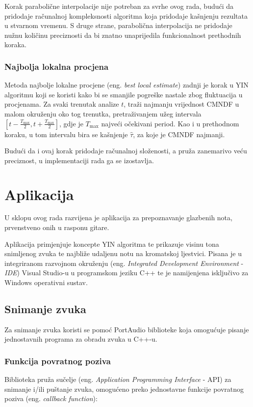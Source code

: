 \documentclass[times, utf8, diplomski, numeric]{fer}
\begin{document}
Korak parabolične interpolacije nije potreban za svrhe ovog rada, budući da pridodaje računalnoj kompleksnosti algoritma koja pridodaje kašnjenju rezultata u stvarnom vremenu. S druge strane, parabolična interpolacija ne pridodaje nužnu količinu preciznosti da bi znatno unaprijedila funkcionalnost prethodnih koraka.

\subsection{Najbolja lokalna procjena}
%
Metoda najbolje lokalne procjene (eng. \textit{best local estimate}) zadnji je korak u YIN algoritmu koji se koristi kako bi se smanjile pogreške nastale zbog fluktuacija u procjenama. Za svaki trenutak analize $t$, traži najmanju vrijednost CMNDF u malom okruženju oko tog trenutka, pretraživanjem užeg intervala $[t - \frac{T_{\text{max}}}{2}, t + \frac{T_{\text{max}}}{2}]$, gdje je $T_{\text{max}}$ najveći očekivani period. Kao i u prethodnom koraku, u tom intervalu bira se kašnjenje $\hat{\tau}$, za koje je CMNDF najmanji.

Budući da i ovaj korak pridodaje računalnoj složenosti, a pruža zanemarivo veću preciznost, u implementaciji rada ga se izostavlja.

\chapter{Aplikacija}
%
U sklopu ovog rada razvijena je aplikacija za prepoznavanje glazbenih nota, prvenstveno onih u rasponu gitare.

Aplikacija primjenjuje koncepte YIN algoritma te prikazuje visinu tona snimljenog zvuka te najbliže udaljenu notu na kromatskoj ljestvici. Pisana je u integriranom razvojnom okruženju (eng. \textit{Integrated Development Environment} - \textit{IDE}) Visual Studio-u u programskom jeziku C++ te je namijenjena isključivo za Windows operativni sustav.

\section{Snimanje zvuka}
%
Za snimanje zvuka koristi se pomoć PortAudio\cite{portaudio} biblioteke koja omogućuje pisanje jednostavnih programa za obradu zvuka u C++-u.

\subsection{Funkcija povratnog poziva}
%
Biblioteka pruža sučelje (eng. \textit{Application Programming Interface} - API) za snimanje i/ili puštanje zvuka, omogućeno preko jednostavne funkcije povratnog poziva (eng. \textit{callback function}):
\end{document}
